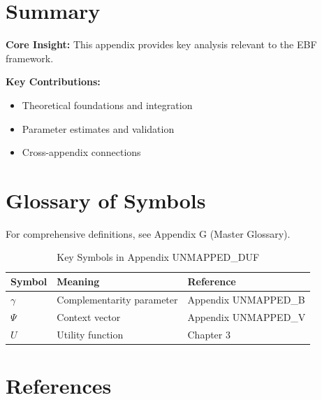 \section{Summary}
\label{sec:duf-summary}

\begin{tcolorbox}[colback=gray!5!white, colframe=gray!75!black,
    title=Appendix duf Summary]

\textbf{Core Insight:}
This appendix provides key analysis relevant to the EBF framework.

\textbf{Key Contributions:}
\begin{itemize}[nosep]
    \item Theoretical foundations and integration
    \item Parameter estimates and validation
    \item Cross-appendix connections
\end{itemize}

\end{tcolorbox}

\section{Glossary of Symbols}
\label{sec:duf-glossary}

For comprehensive definitions, see Appendix G (Master Glossary).

\begin{table}[htbp]
\centering
\caption{Key Symbols in Appendix UNMAPPED_DUF}
\begin{tabular}{lll}
\toprule
\textbf{Symbol} & \textbf{Meaning} & \textbf{Reference} \\
\midrule
$\gamma$ & Complementarity parameter & Appendix UNMAPPED_B \\
$\Psi$ & Context vector & Appendix UNMAPPED_V \\
$U$ & Utility function & Chapter 3 \\
\bottomrule
\end{tabular}
\end{table}


\section{References}
\label{sec:duf-references}

